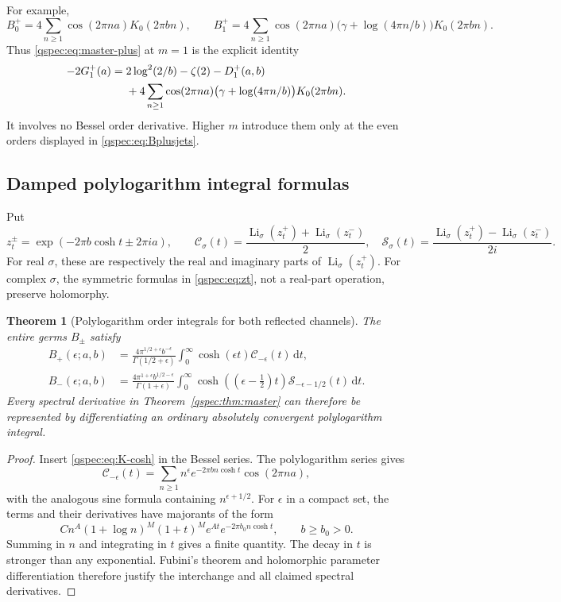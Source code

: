 \documentclass[11pt,letterpaper]{article}
\numberwithin{equation}{section}
\newtheorem{theorem}{Theorem}[section]
\theoremstyle{definition}
\newcommand{\Li}{\operatorname{Li}}
\newcommand{\dd}{\,\mathrm{d}}
\begin{document}
For example,
\[
B_0^+=4\sum_{n\ge1}\cos(2\pi na)K_0(2\pi bn),\qquad
B_1^+=4\sum_{n\ge1}\cos(2\pi na)
\bigl(\gamma+\log(4\pi n/b)\bigr)K_0(2\pi bn).
\]
Thus \eqref{qspec:eq:master-plus} at $m=1$ is the explicit identity
\begin{align}
-2G_1^+(a)={}&2\log^2(2/b)-\zeta(2)-D_1^+(a,b)\notag\\
&+4\sum_{n\ge1}\cos(2\pi na)
\bigl(\gamma+\log(4\pi n/b)\bigr)K_0(2\pi bn).
\label{qspec:eq:first-stieltjes-example}
\end{align}
It involves no Bessel order derivative. Higher $m$ introduce them only
at the even orders displayed in \eqref{qspec:eq:Bplusjets}.

\subsection{Damped polylogarithm integral formulas}
Put
\begin{equation}\label{qspec:eq:zt}
z_t^\pm=\exp(-2\pi b\cosh t\pm2\pi ia),\qquad
\mathcal C_\sigma(t)=\frac{\Li_\sigma(z_t^+)+\Li_\sigma(z_t^-)}2,
\quad
\mathcal S_\sigma(t)=\frac{\Li_\sigma(z_t^+)-\Li_\sigma(z_t^-)}{2i}.
\end{equation}
For real $\sigma$, these are respectively the real and imaginary parts of
$\Li_\sigma(z_t^+)$. For complex $\sigma$, the symmetric formulas in
\eqref{qspec:eq:zt}, not a real-part operation, preserve holomorphy.

\begin{theorem}[Polylogarithm order integrals for both reflected channels]
\label{qspec:thm:polylog-integrals}
The entire germs $B_\pm$ satisfy
\begin{align}
B_+(\epsilon;a,b)&=
\frac{4\pi^{1/2+\epsilon}b^{-\epsilon}}{\Gamma(1/2+\epsilon)}
\int_0^\infty\cosh(\epsilon t)\mathcal C_{-\epsilon}(t)\dd t,
\label{qspec:eq:polylogplus}\\
B_-(\epsilon;a,b)&=
\frac{4\pi^{1+\epsilon}b^{1/2-\epsilon}}{\Gamma(1+\epsilon)}
\int_0^\infty\cosh((\epsilon-\tfrac12)t)
\mathcal S_{-\epsilon-1/2}(t)\dd t.
\label{qspec:eq:polylogminus}
\end{align}
Every spectral derivative in Theorem~\ref{qspec:thm:master} can therefore
be represented by differentiating an ordinary absolutely convergent
polylogarithm integral.
\end{theorem}
\begin{proof}
Insert \eqref{qspec:eq:K-cosh} in the Bessel series. The polylogarithm
series \cite{polylog} gives
\[
\mathcal C_{-\epsilon}(t)=\sum_{n\ge1}n^\epsilon
 e^{-2\pi bn\cosh t}\cos(2\pi na),
\]
with the analogous sine formula containing $n^{\epsilon+1/2}$.
For $\epsilon$ in a compact set, the terms and their derivatives have
majorants of the form
\[
C n^A(1+\log n)^M(1+t)^M e^{At}e^{-2\pi b_0n\cosh t},
\qquad b\ge b_0>0.
\]
Summing in $n$ and integrating in $t$ gives a finite quantity. The decay
in $t$ is stronger than any exponential. Fubini's theorem and holomorphic
parameter differentiation therefore justify the interchange and all
claimed spectral derivatives.
\end{proof}
\end{document}
